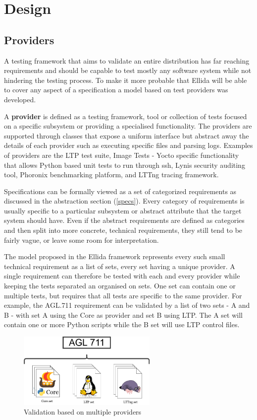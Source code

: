\chapter{Design}

\section{Providers}
A testing framework that aims to validate an entire distribution has far reaching requirements and should be capable to test mostly any software system while not hindering the testing process. To make it more probable that Ellida will be able to cover any aspect of a specification a model based on test providers was developed.

A \textbf{provider} is defined as a testing framework, tool or collection of tests focused on a specific subsystem or providing a specialised functionality. The providers are supported through classes that expose a uniform interface but abstract away the details of each provider such as executing specific files and parsing logs. Examples of providers are the LTP test suite, Image Tests - Yocto specific functionality that allows Python based unit tests to run through ssh, Lynis security auditing tool, Phoronix benchmarking platform, and LTTng tracing framework.

Specifications can be formally viewed as a set of categorized requirements as discussed in the abstraction section (\ref{specs}). Every category of requirements is usually specific to a particular subsystem or abstract attribute that the target system should have. Even if the abstract requirements are defined as categories and then split into more concrete, technical requirements, they still tend to be fairly vague, or leave some room for interpretation.

The model proposed in the Ellida framework represents every such small technical requirement as a list of sets, every set having a unique provider. A single requirement can therefore be tested with each and every provider while keeping the tests separated an organised on sets. One set can contain one or multiple tests, but requires that all tests are specific to the same provider. For example, the AGL.711 requirement can be validated by a list of two sets - A and B - with set A using the Core as provider and set B using LTP. The A set will contain one or more Python scripts while the B set will use LTP control files.

\begin{figure}[h!]
  \centering
	\includegraphics[width=0.6\textwidth]{images/providers.png}
    \caption{Validation based on multiple providers}
\end{figure}

